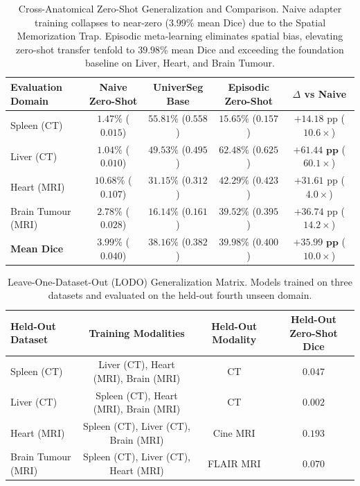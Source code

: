 \begin{table}[t]
\centering
\caption{Cross-Anatomical Zero-Shot Generalization and Comparison. Naive adapter training collapses to near-zero ($3.99\%$ mean Dice) due to the Spatial Memorization Trap. Episodic meta-learning eliminates spatial bias, elevating zero-shot transfer tenfold to $39.98\%$ mean Dice and exceeding the foundation baseline on Liver, Heart, and Brain Tumour.}
\label{tab:zeroshot_matrix}
\begin{tabular}{l|c|c|c|c}
\hline
\textbf{Evaluation Domain} & \textbf{Naive Zero-Shot} & \textbf{UniverSeg Base} & \textbf{Episodic Zero-Shot} & \textbf{$\Delta$ vs Naive} \\
\hline
Spleen (CT)        & $1.47\%$ ($0.015$)  & $55.81\%$ ($0.558$) & $\mathbf{15.65\%}$ ($0.157$) & $+14.18\text{ pp}$ ($10.6\times$) \\
Liver (CT)         & $1.04\%$ ($0.010$)  & $49.53\%$ ($0.495$) & $\mathbf{62.48\%}$ ($0.625$) & $\mathbf{+61.44\text{ pp}}$ ($60.1\times$) \\
Heart (MRI)        & $10.68\%$ ($0.107$) & $31.15\%$ ($0.312$) & $\mathbf{42.29\%}$ ($0.423$) & $+31.61\text{ pp}$ ($4.0\times$) \\
Brain Tumour (MRI) & $2.78\%$ ($0.028$)  & $16.14\%$ ($0.161$) & $\mathbf{39.52\%}$ ($0.395$) & $+36.74\text{ pp}$ ($14.2\times$) \\
\hline
\textbf{Mean Dice} & $\mathbf{3.99\%}$ ($0.040$) & $\mathbf{38.16\%}$ ($0.382$) & $\mathbf{39.98\%}$ ($0.400$) & $\mathbf{+35.99\text{ pp}}$ ($\mathbf{10.0\times}$) \\
\hline
\end{tabular}
\end{table}


\begin{table}[t]
\centering
\caption{Leave-One-Dataset-Out (LODO) Generalization Matrix. Models trained on three datasets and evaluated on the held-out fourth unseen domain.}
\label{tab:lodo_matrix}
\begin{tabular}{l|c|c|c}
\hline
\textbf{Held-Out Dataset} & \textbf{Training Modalities} & \textbf{Held-Out Modality} & \textbf{Held-Out Zero-Shot Dice} \\
\hline
Spleen (CT)        & Liver (CT), Heart (MRI), Brain (MRI) & CT       & $0.047$ \\
Liver (CT)         & Spleen (CT), Heart (MRI), Brain (MRI)& CT       & $0.002$ \\
Heart (MRI)        & Spleen (CT), Liver (CT), Brain (MRI) & Cine MRI & $\mathbf{0.193}$ \\
Brain Tumour (MRI) & Spleen (CT), Liver (CT), Heart (MRI) & FLAIR MRI& $\mathbf{0.070}$ \\
\hline
\end{tabular}
\end{table}


